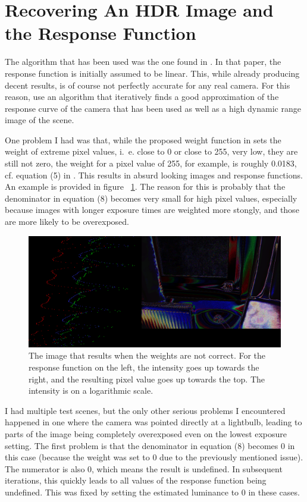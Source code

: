 \section{Recovering An HDR Image and the Response Function}\label{sec:hdr}

The algorithm that has been used was the one found in \cite{rbs99}. In that
paper, the response function is initially assumed to be linear. This, while
already producing decent results, is of course not perfectly accurate for any
real camera. For this reason, \cite{rbs99} use an algorithm that iteratively
finds a good approximation of the response curve of the camera that has been
used as well as a high dynamic range image of the scene.

One problem I had was that, while the proposed weight function in \cite{rbs99}
sets the weight of extreme pixel values, i.~e. close to 0 or close to 255, very
low, they are still not zero, the weight for a pixel value of 255, for example,
is roughly 0.0183, cf. equation (5) in \cite{rbs99}. This results in absurd
looking images and response functions. An example is provided in figure~
\ref{fig:wrongweights}. The reason for this is probably that the denominator in
equation (8) becomes very small for high pixel values, especially because
images with longer exposure times are weighted more stongly, and those are more
likely to be overexposed.

\begin{figure}[ht]
  \centering
  \includegraphics[width=\textwidth]{wrongweights.png}
  \caption{The image that results when the weights are not correct. For the
  response function on the left, the intensity goes up towards the right, and
  the resulting pixel value goes up towards the top. The intensity is on a
  logarithmic scale.}
  \label{fig:wrongweights}
\end{figure}

I had multiple test scenes, but the only other serious problems I encountered
happened in one where the camera was pointed directly at a lightbulb, leading
to parts of the image being completely overexposed even on the lowest exposure
setting. The first problem is that the denominator in equation (8) becomes 0 in
this case (because the weight was set to 0 due to the previously mentioned
issue). The numerator is also 0, which means the result is undefined. In
subsequent iterations, this quickly leads to all values of the response
function being undefined. This was fixed by setting the estimated luminance to
0 in these cases.

